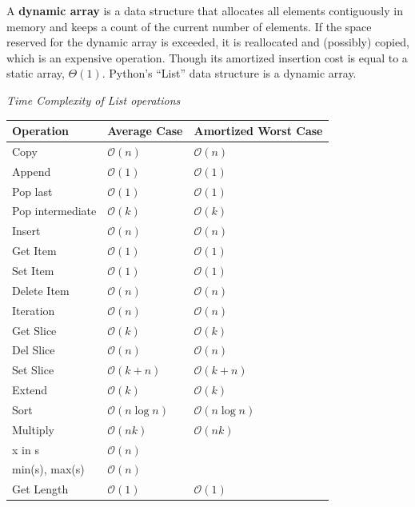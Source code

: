 \documentclass{article}
\newcommand{\bigO}{\mathcal{O}}
\begin{document}
    
    A \textbf{dynamic array} is a data structure that allocates all elements contiguously in memory and keeps a count of the current number of elements. If the space reserved for the dynamic array is exceeded, it is reallocated and (possibly) copied, which is an expensive operation. Though its amortized insertion cost is equal to a static array, $\Theta(1)$. Python's  ``List'' data structure is a dynamic array.
    
    \vspace{8pt} \emph{Time Complexity of List operations}
    \begin{table}[H]
        \begin{tabular}{|l|l|l|}
            \hline
            \textbf{Operation} & \textbf{Average Case} & \textbf{Amortized Worst Case} \\
            \hline
            Copy & $\bigO(n)$ & $\bigO(n)$ \\
            Append & $\bigO(1)$ & $\bigO(1)$\\
            Pop last & $\bigO(1)$ & $\bigO(1)$ \\
            Pop intermediate & $\bigO(k)$ & $\bigO(k)$ \\
            Insert & $\bigO(n)$ & $\bigO(n)$ \\
            Get Item & $\bigO(1)$ & $\bigO(1)$ \\
            Set Item & $\bigO(1)$ & $\bigO(1)$ \\
            Delete Item & $\bigO(n)$ & $\bigO(n)$ \\
            Iteration & $\bigO(n)$ & $\bigO(n)$ \\
            Get Slice & $\bigO(k)$ & $\bigO(k)$\\
            Del Slice & $\bigO(n)$ & $\bigO(n)$ \\
            Set Slice & $\bigO(k+n)$ & $\bigO(k+n)$\\
            Extend & $\bigO(k)$ & $\bigO(k)$\\
            Sort & $\bigO(n\log n)$ &$\bigO(n\log n)$\\
            Multiply & $\bigO(nk)$ & $\bigO(nk)$ \\
            x in s & $\bigO(n)$ &  \\
            min(s), max(s) & $\bigO(n)$ & \\
            Get Length & $\bigO(1)$ & $\bigO(1)$ \\
            \hline
        \end{tabular}
    \end{table}
\end{document}
